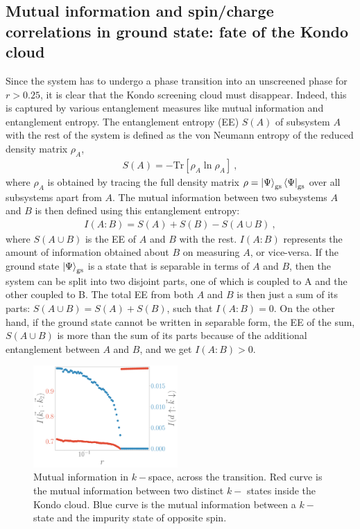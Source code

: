 \documentclass[reprint,superscriptaddress,floatfix]{revtex4-2}
\begin{document}
\subsection{Mutual information and spin/charge correlations in ground state: fate of the Kondo cloud}
Since the system has to undergo a phase transition into an unscreened phase for \(r > 0.25\), it is clear that the Kondo screening cloud must disappear. Indeed, this is captured by various entanglement measures like mutual information and entanglement entropy. The entanglement entropy (EE) \(S(A)\) of subsystem \(A\) with the rest of the system is defined as the von Neumann entropy of the reduced density matrix \(\rho_A\),
\begin{equation}\begin{aligned}
	S(A) = -\text{Tr}\left[\rho_A \ln \rho_A\right]~,
\end{aligned}\end{equation}
where \(\rho_A\) is obtained by tracing the full density matrix \(\rho = \ket{\Psi}_\text{gs} \bra{\Psi}_\text{gs}\) over all subsystems apart from \(A\). The mutual information between two subsystems \(A\) and \(B\) is then defined using this entanglement entropy:
\begin{equation}\begin{aligned}
	I(A:B) = S(A) + S(B) - S(A \cup B)~,
\end{aligned}\end{equation}
where \(S(A \cup B)\) is the EE of \(A\) and \(B\) with the rest. \(I(A:B)\) represents the amount of information obtained about \(B\) on measuring \(A\), or vice-versa. If the ground state \(\ket{\Psi}_\text{gs}\) is a state that is separable in terms of \(A\) and \(B\), then the system can be split into two disjoint parts, one of which is coupled to A and the other coupled to B.  The total EE from both \(A\) and \(B\) is then just a sum of its parts: \(S(A\cup B) = S(A) + S(B)\), such that \(I(A:B) = 0\). On the other hand, if the ground state cannot be written in separable form, the EE of the sum, \(S(A \cup B)\) is more than the sum of its parts because of the additional entanglement between \(A\) and \(B\), and we get \(I(A:B) > 0\).

\begin{figure}[!htb]
\includegraphics[width=0.49\textwidth]{I_k.pdf}
\caption{Mutual information in \(k-\)space, across the transition. Red curve is the mutual information between two distinct \(k-\) states inside the Kondo cloud. Blue curve is the mutual information between a \(k-\)state and the impurity state of opposite spin.}
\label{mut_inf_k}
\end{figure}
\end{document}
